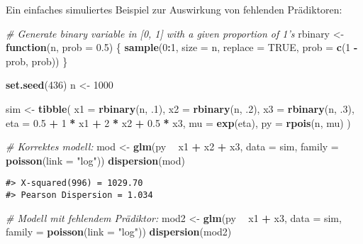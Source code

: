 \documentclass[ngerman,a4paper,]{scrartcl}
\newenvironment{Shaded}{\begin{snugshade}}{\end{snugshade}}
\newcommand{\CommentTok}[1]{\textcolor[rgb]{0.56,0.35,0.01}{\textit{#1}}}
\newcommand{\ControlFlowTok}[1]{\textcolor[rgb]{0.13,0.29,0.53}{\textbf{#1}}}
\newcommand{\DataTypeTok}[1]{\textcolor[rgb]{0.13,0.29,0.53}{#1}}
\newcommand{\DecValTok}[1]{\textcolor[rgb]{0.00,0.00,0.81}{#1}}
\newcommand{\FloatTok}[1]{\textcolor[rgb]{0.00,0.00,0.81}{#1}}
\newcommand{\KeywordTok}[1]{\textcolor[rgb]{0.13,0.29,0.53}{\textbf{#1}}}
\newcommand{\NormalTok}[1]{#1}
\newcommand{\OperatorTok}[1]{\textcolor[rgb]{0.81,0.36,0.00}{\textbf{#1}}}
\newcommand{\OtherTok}[1]{\textcolor[rgb]{0.56,0.35,0.01}{#1}}
\newcommand{\StringTok}[1]{\textcolor[rgb]{0.31,0.60,0.02}{#1}}
\theoremstyle{definition}
\theoremstyle{definition}
\theoremstyle{definition}
\theoremstyle{remark}
\begin{document}
Ein einfaches simuliertes Beispiel zur Auswirkung von fehlenden Prädiktoren:

\begin{Shaded}
\begin{Highlighting}[]
\CommentTok{# Generate binary variable in [0, 1] with a given proportion of 1's}
\NormalTok{rbinary <-}\StringTok{ }\ControlFlowTok{function}\NormalTok{(n, }\DataTypeTok{prob =} \FloatTok{0.5}\NormalTok{) \{}
  \KeywordTok{sample}\NormalTok{(}\DecValTok{0}\OperatorTok{:}\DecValTok{1}\NormalTok{, }\DataTypeTok{size =}\NormalTok{ n, }\DataTypeTok{replace =} \OtherTok{TRUE}\NormalTok{, }\DataTypeTok{prob =} \KeywordTok{c}\NormalTok{(}\DecValTok{1} \OperatorTok{-}\StringTok{ }\NormalTok{prob, prob))}
\NormalTok{\}}

\KeywordTok{set.seed}\NormalTok{(}\DecValTok{436}\NormalTok{)}
\NormalTok{n <-}\StringTok{ }\DecValTok{1000}

\NormalTok{sim <-}\StringTok{ }\KeywordTok{tibble}\NormalTok{(}
  \DataTypeTok{x1 =} \KeywordTok{rbinary}\NormalTok{(n, }\FloatTok{.1}\NormalTok{),}
  \DataTypeTok{x2 =} \KeywordTok{rbinary}\NormalTok{(n, }\FloatTok{.2}\NormalTok{),}
  \DataTypeTok{x3 =} \KeywordTok{rbinary}\NormalTok{(n, }\FloatTok{.3}\NormalTok{),}
  \DataTypeTok{eta =} \FloatTok{0.5} \OperatorTok{+}\StringTok{ }\DecValTok{1} \OperatorTok{*}\StringTok{ }\NormalTok{x1 }\OperatorTok{+}\StringTok{ }\DecValTok{2} \OperatorTok{*}\StringTok{ }\NormalTok{x2 }\OperatorTok{+}\StringTok{ }\FloatTok{0.5} \OperatorTok{*}\StringTok{ }\NormalTok{x3,}
  \DataTypeTok{mu =} \KeywordTok{exp}\NormalTok{(eta),}
  \DataTypeTok{py =} \KeywordTok{rpois}\NormalTok{(n, mu)}
\NormalTok{)}

\CommentTok{# Korrektes modell:}
\NormalTok{mod <-}\StringTok{ }\KeywordTok{glm}\NormalTok{(py }\OperatorTok{~}\StringTok{ }\NormalTok{x1 }\OperatorTok{+}\StringTok{ }\NormalTok{x2 }\OperatorTok{+}\StringTok{ }\NormalTok{x3, }\DataTypeTok{data =}\NormalTok{ sim, }\DataTypeTok{family =} \KeywordTok{poisson}\NormalTok{(}\DataTypeTok{link =} \StringTok{"log"}\NormalTok{))}
\KeywordTok{dispersion}\NormalTok{(mod)}
\end{Highlighting}
\end{Shaded}

\begin{verbatim}
#> X-squared(996) = 1029.70
#> Pearson Dispersion = 1.034
\end{verbatim}

\begin{Shaded}
\begin{Highlighting}[]
\CommentTok{# Modell mit fehlendem Prädiktor:}
\NormalTok{mod2 <-}\StringTok{ }\KeywordTok{glm}\NormalTok{(py }\OperatorTok{~}\StringTok{ }\NormalTok{x1 }\OperatorTok{+}\StringTok{ }\NormalTok{x3, }\DataTypeTok{data =}\NormalTok{ sim, }\DataTypeTok{family =} \KeywordTok{poisson}\NormalTok{(}\DataTypeTok{link =} \StringTok{"log"}\NormalTok{))}
\KeywordTok{dispersion}\NormalTok{(mod2)}
\end{Highlighting}
\end{Shaded}
\end{document}
